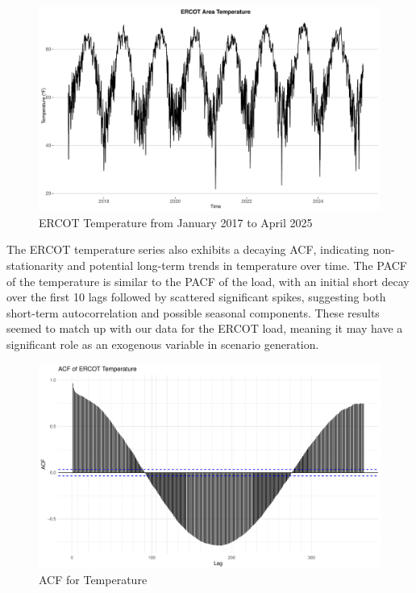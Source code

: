 \documentclass[
]{article}
\begin{document}
\begin{figure}
\centering
\includegraphics{FinalProject_Report_files/figure-latex/Temp TS-1.pdf}
\caption{ERCOT Temperature from January 2017 to April 2025}
\end{figure}

The ERCOT temperature series also exhibits a decaying ACF, indicating
non-stationarity and potential long-term trends in temperature over
time. The PACF of the temperature is similar to the PACF of the load,
with an initial short decay over the first 10 lags followed by scattered
significant spikes, suggesting both short-term autocorrelation and
possible seasonal components. These results seemed to match up with our
data for the ERCOT load, meaning it may have a significant role as an
exogenous variable in scenario generation.

\begin{figure}
\centering
\includegraphics{FinalProject_Report_files/figure-latex/Temp ACF-1.pdf}
\caption{ACF for Temperature}
\end{figure}
\end{document}
